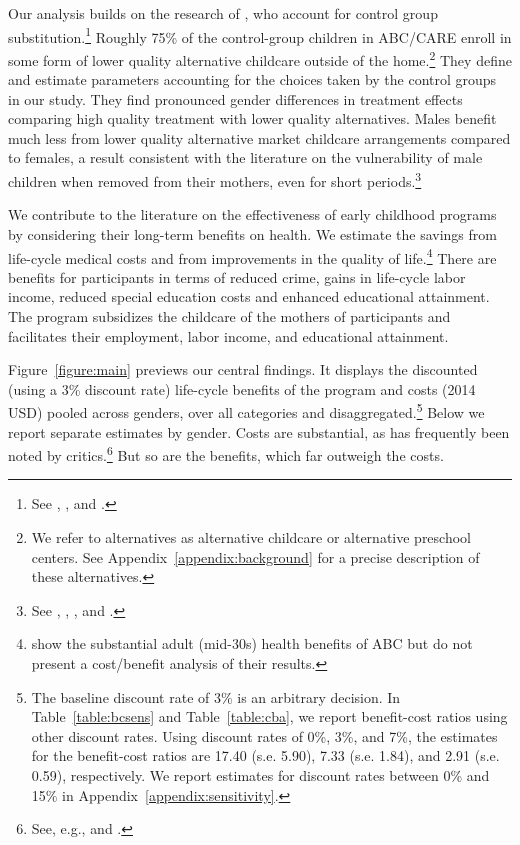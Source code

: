 Our analysis builds on the research of \cite{Garcia_Ziff_2017_Gender-Diff_UNPUBLISHED}, who account for control group substitution.\footnote{See \cite{Heckman_1992_randomization}, \cite{Heckman_Hohmann_etal_2000_QJE}, and \cite{Kline_Walters_2016_QJE}.} Roughly 75\% of the control-group children in ABC/CARE enroll in some form of lower quality alternative childcare outside of the home.\footnote{We refer to alternatives as alternative childcare or alternative preschool centers. See  Appendix~\ref{appendix:background} for a precise description of these alternatives.} They define and estimate parameters accounting for the choices taken by the control groups in our study. They find pronounced gender differences in treatment effects comparing high quality treatment with lower quality alternatives. Males benefit much less from lower quality alternative market childcare arrangements compared to females, a result consistent with the literature on the vulnerability of male children when removed from their mothers, even for short periods.\footnote{See \citet{Kottelenberg-Lehrer_2014_Gender-Effects}, \citet{Baker_Gruber_Milligan_2015_Noncog_Defects}, \cite{Schore_2017_IMHJ}, and \cite{Garcia_Ziff_2017_Gender-Diff_UNPUBLISHED}.}

We contribute to the literature on the effectiveness of early childhood programs by considering their long-term benefits on health. We estimate the savings from life-cycle medical costs and from improvements in the quality of life.\footnote{\cite{Campbell_Conti_etal_2014_EarlyChildhoodInvestments} show the substantial adult (mid-30s) health benefits of ABC but do not present a cost/benefit analysis of their results.} There are benefits for participants in terms of reduced crime, gains in life-cycle labor income, reduced special education costs and enhanced educational attainment. The program subsidizes the childcare of the mothers of participants and facilitates their employment, labor income, and educational attainment.

Figure~\ref{figure:main} previews our central findings. It displays the discounted (using a 3\% discount rate) life-cycle benefits of the program and costs (2014 USD) pooled across genders, over all categories and disaggregated.\footnote{The baseline discount rate of 3\% is an arbitrary decision. In Table~\ref{table:bcsens} and Table~\ref{table:cba}, we report benefit-cost ratios using other discount rates. Using discount rates of 0\%, 3\%, and 7\%, the estimates for the benefit-cost ratios are 17.40 (s.e. 5.90), 7.33 (s.e. 1.84), and 2.91 (s.e. 0.59), respectively. We report estimates for discount rates between 0\% and 15\% in  Appendix~\ref{appendix:sensitivity}.} Below we report separate estimates by gender. Costs are substantial, as has frequently been noted by critics.\footnote{See, e.g., \citet{Whitehurst_2014_Senate_Testimony} and \citet{Fox_News_2014_Head_Start_Effects}.} But so are the benefits, which far outweigh the costs.

